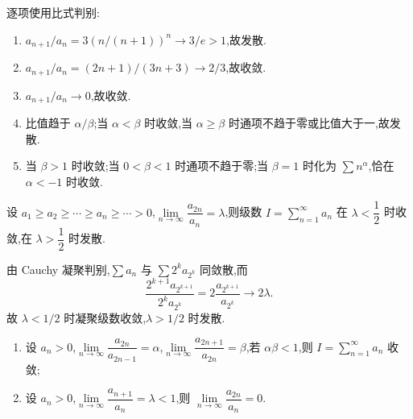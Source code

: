 \begin{solution}
    逐项使用比式判别:
    \begin{enumerate}
        \item $a_{n+1}/a_n=3(n/(n+1))^n\to3/e>1$,故发散.
        \item $a_{n+1}/a_n=(2n+1)/(3n+3)\to2/3$,故收敛.
        \item $a_{n+1}/a_n\to0$,故收敛.
        \item 比值趋于 $\alpha/\beta$;当 $\alpha<\beta$ 时收敛,当
              $\alpha\geq\beta$ 时通项不趋于零或比值大于一,故发散.
        \item 当 $\beta>1$ 时收敛;当 $0<\beta<1$ 时通项不趋于零;当
              $\beta=1$ 时化为 $\displaystyle \sum n^\alpha$,恰在 $\alpha<-1$ 时收敛.
    \end{enumerate}
\end{solution}

\begin{example}
    设 $a_1\geq a_2\geq\cdots\geq a_n\geq\cdots>0$,$\displaystyle\lim\limits_{n\to\infty}\dfrac{a_{2n}}{a_n}=\lambda$,则级数 $\displaystyle I=\sum\limits_{n=1}^{\infty}a_n$ 在 $\lambda<\dfrac{1}{2}$ 时收敛,在 $\lambda>\dfrac{1}{2}$ 时发散.
\end{example}
\exampleblank

\begin{solution}
    由 Cauchy 凝聚判别,$\displaystyle \sum a_n$ 与 $\displaystyle \sum2^ka_{2^k}$ 同敛散,而
    \[
        \dfrac{2^{k+1}a_{2^{k+1}}}{2^ka_{2^k}}
        =2\dfrac{a_{2^{k+1}}}{a_{2^k}}\longrightarrow2\lambda.
    \]
    故 $\lambda<1/2$ 时凝聚级数收敛,$\lambda>1/2$ 时发散.
\end{solution}

\begin{example}
    \begin{enumerate}
        \item 设 $a_n>0$,$\displaystyle\lim\limits_{n\to\infty}\dfrac{a_{2n}}{a_{2n-1}}=\alpha$,$\displaystyle\lim\limits_{n\to\infty}\dfrac{a_{2n+1}}{a_{2n}}=\beta$,若 $\alpha\beta<1$,则 $\displaystyle I=\sum\limits_{n=1}^{\infty}a_n$ 收敛;
        \item 设 $a_n>0$,$\displaystyle\lim\limits_{n\to\infty}\dfrac{a_{n+1}}{a_n}=\lambda<1$,则 $\displaystyle\lim\limits_{n\to\infty}\dfrac{a_{2n}}{a_n}=0$.
    \end{enumerate}
\end{example}
\exampleblank


